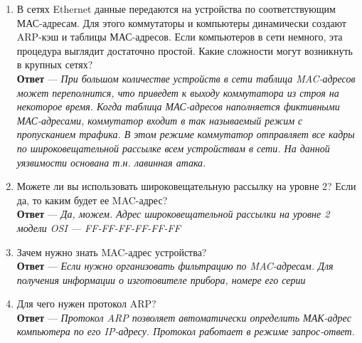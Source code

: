 \documentclass[a4paper,14pt]{extarticle}
\begin{document}
\begin{enumerate}
	\item В сетях Ethernet данные передаются на устройства по соответствующим МАС-адресам. Для
	этого коммутаторы и компьютеры динамически создают ARP-кэш и таблицы МАС-адресов.
	Если компьютеров в сети немного, эта процедура выглядит достаточно простой. Какие
	сложности могут возникнуть в крупных сетях? 
	\\\textbf{Ответ} --- \textit{При большом количестве устройств в сети таблица MAC-адресов может переполнится, что приведет к выходу коммутатора из строя на некоторое время. Когда таблица МАС-адресов наполняется фиктивными МАС-адресами, коммутатор входит в так называемый режим с пропусканием трафика. В этом режиме коммутатор отправляет все кадры по широковещательной рассылке всем устройствам в сети. На данной уязвимости основана т.н. лавинная атака.}
	\item Можете ли вы использовать широковещательную рассылку на уровне 2? Если да, то каким
	будет ее MAC-адрес?
	\\ \textbf{Ответ} --- \textit{Да, можем. Адрес широковещательной рассылки на уровне 2 модели OSI --- FF-FF-FF-FF-FF-FF}
	\item Зачем нужно знать MAC-адрес устройства?
	\\ \textbf{Ответ} --- \textit{Если нужно организовать фильтрацию по MAC-адресам. Для получения информации о изготовителе прибора, номере его серии}
	\item Для чего нужен протокол ARP?
	\\ \textbf{Ответ} --- \textit{Протокол ARP позволяет автоматически определить МАК-адрес компьютера по его IP-адресу. Протокол работает в режиме запрос-ответ.}
\end{enumerate}
\end{document}
